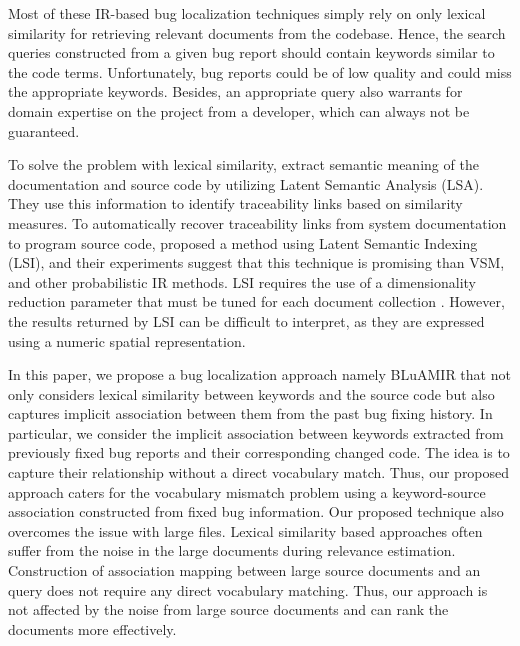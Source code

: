 \documentclass[conference]{IEEEtran}
\begin{document}
Most of these IR-based bug localization techniques simply rely on only lexical similarity for retrieving relevant documents from the codebase. Hence, the search queries constructed from a given bug report should contain keywords similar to the code terms. Unfortunately, bug reports could be of low quality and could miss the appropriate keywords. Besides, an appropriate query also warrants for domain expertise on the project from a developer, which can always not be guaranteed. 

To solve the problem with lexical similarity, \citet{Maletic, MarcusMaletic} extract semantic meaning of the documentation and source code by utilizing Latent Semantic Analysis (LSA). They use this information to identify traceability links based on similarity measures. To automatically recover traceability links from system documentation to program source code, \citet{MarcusLSI} proposed a method using Latent Semantic Indexing (LSI), and their experiments suggest that this technique is promising than VSM, and other probabilistic IR methods.
LSI requires the use of a dimensionality reduction parameter that must be tuned for each document collection \cite{Kontostathis}.
However, the results returned by LSI can be difficult to interpret, as
they are expressed using a numeric spatial representation.

In this paper, we propose a bug localization approach namely BLuAMIR that not only considers lexical similarity between keywords and the source code but also captures implicit association between them from the past bug fixing history. 
In particular, we consider the implicit association between keywords extracted from previously fixed bug reports and their corresponding changed code. The idea is to capture their relationship without a direct vocabulary match.  
Thus, our proposed approach caters for the vocabulary mismatch problem using a keyword-source association constructed from fixed bug information. 
Our proposed technique also overcomes the issue with large files. Lexical similarity based approaches often suffer from the noise in the large documents during relevance estimation. Construction of association mapping between large source documents and an query does not require any direct vocabulary matching. Thus, our approach is not affected by the noise from large source documents and can rank the documents more effectively.
\end{document}
